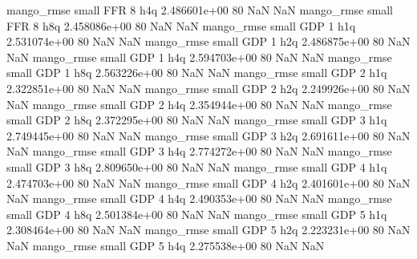       mango_rmse      small      FFR                 8                  h4q 2.486601e+00 80            NaN                NaN
       mango_rmse      small      FFR                 8                  h8q 2.458086e+00 80            NaN                NaN
       mango_rmse      small      GDP                 1                  h1q 2.531074e+00 80            NaN                NaN
       mango_rmse      small      GDP                 1                  h2q 2.486875e+00 80            NaN                NaN
       mango_rmse      small      GDP                 1                  h4q 2.594703e+00 80            NaN                NaN
       mango_rmse      small      GDP                 1                  h8q 2.563226e+00 80            NaN                NaN
       mango_rmse      small      GDP                 2                  h1q 2.322851e+00 80            NaN                NaN
       mango_rmse      small      GDP                 2                  h2q 2.249926e+00 80            NaN                NaN
       mango_rmse      small      GDP                 2                  h4q 2.354944e+00 80            NaN                NaN
       mango_rmse      small      GDP                 2                  h8q 2.372295e+00 80            NaN                NaN
       mango_rmse      small      GDP                 3                  h1q 2.749445e+00 80            NaN                NaN
       mango_rmse      small      GDP                 3                  h2q 2.691611e+00 80            NaN                NaN
       mango_rmse      small      GDP                 3                  h4q 2.774272e+00 80            NaN                NaN
       mango_rmse      small      GDP                 3                  h8q 2.809650e+00 80            NaN                NaN
       mango_rmse      small      GDP                 4                  h1q 2.474703e+00 80            NaN                NaN
       mango_rmse      small      GDP                 4                  h2q 2.401601e+00 80            NaN                NaN
       mango_rmse      small      GDP                 4                  h4q 2.490353e+00 80            NaN                NaN
       mango_rmse      small      GDP                 4                  h8q 2.501384e+00 80            NaN                NaN
       mango_rmse      small      GDP                 5                  h1q 2.308464e+00 80            NaN                NaN
       mango_rmse      small      GDP                 5                  h2q 2.223231e+00 80            NaN                NaN
       mango_rmse      small      GDP                 5                  h4q 2.275538e+00 80            NaN                NaN
